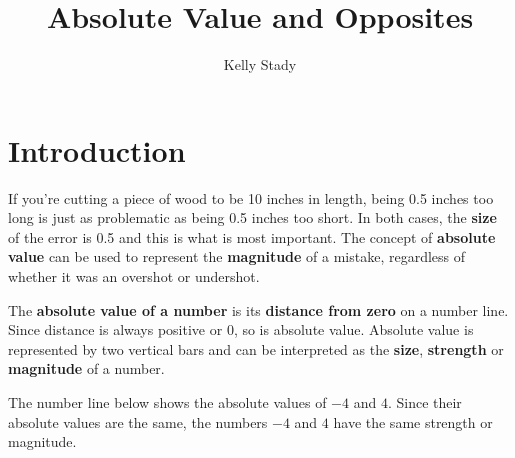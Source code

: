\documentclass{ximera}[font=12pt]
\title{Absolute Value and Opposites}   %
\author{Kelly Stady}
\begin{document}
   

\begin{abstract}

\end{abstract}

\maketitle

\label{xim:AbsValue}


\section*{Introduction}

If you're cutting a piece of wood to be 10 inches in length, being 0.5 inches too long is just as problematic as being 0.5 inches too short. In both cases, the \textbf{size} 
of the error is 0.5 and this is what is most important.  The concept of \textbf{absolute value} can be used to represent the \textbf{magnitude} of a mistake, regardless 
of whether it was an overshot or undershot.

The \textbf{absolute value of a number} is its \textbf{distance from zero} on a number line.  Since distance is always positive or 0, so is absolute value.  Absolute value is represented by two vertical bars and can be interpreted as the \textbf{size}, \textbf{strength} or \textbf{magnitude} of a number.

The number line below shows the absolute values of $-4$ and $4.$  Since their absolute values are the same, the numbers $-4$ and $4$ have the same strength or magnitude.

\begin{center}
\end{center}
\end{document}
